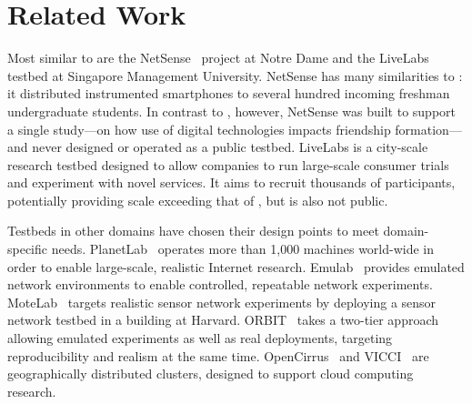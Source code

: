 \section{Related Work}
\label{sec:related}

Most similar to \PhoneLab{} are the NetSense~\cite{netsense-hotplanet}
project at Notre Dame and the LiveLabs~\cite{livelabs-url} testbed at
Singapore Management University. NetSense has many similarities to
\PhoneLab{}: it distributed instrumented smartphones to several hundred
incoming freshman undergraduate students. In contrast to \PhoneLab{},
however, NetSense was built to support a single study---on how use of digital
technologies impacts friendship formation---and never designed or operated as
a public testbed. LiveLabs is a city-scale research testbed designed to allow
companies to run large-scale consumer trials and experiment with novel
services. It aims to recruit thousands of participants, potentially providing
scale exceeding that of \PhoneLab{}, but is also not public.

Testbeds in other domains have chosen their design points to meet
domain-specific needs. PlanetLab~\cite{peterson:ccr:2003} operates more than
1,000 machines world-wide in order to enable large-scale, realistic Internet
research. Emulab~\cite{white:osdi:2002} provides emulated network
environments to enable controlled, repeatable network experiments.
MoteLab~\cite{werner-allen:ipsn:2005} targets realistic sensor network
experiments by deploying a sensor network testbed in a building at Harvard.
ORBIT~\cite{raychaudhuri:tridentcom:2005} takes a two-tier approach allowing
emulated experiments as well as real deployments, targeting reproducibility
and realism at the same time. OpenCirrus~\cite{avetisyan:computer:2010} and
VICCI~\cite{vicci} are geographically distributed clusters, designed to
support cloud computing research.
